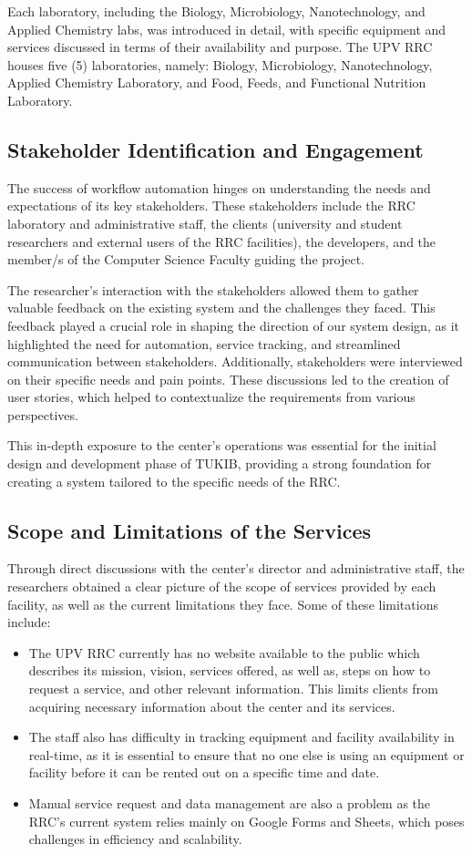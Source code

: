 Each laboratory, including the Biology, Microbiology, Nanotechnology, and Applied Chemistry labs, was introduced in detail, with specific equipment and services discussed in terms of their availability and purpose. The UPV RRC houses five (5) laboratories, namely: Biology, Microbiology, Nanotechnology, Applied Chemistry Laboratory, and Food, Feeds, and Functional Nutrition Laboratory.

\subsection{Stakeholder Identification and Engagement}
The success of workflow automation hinges on understanding the needs and expectations of its key stakeholders. These stakeholders include the RRC laboratory and administrative staff, the clients (university and student researchers and external users of the RRC facilities), the developers, and the member/s of the Computer Science Faculty guiding the project.

The researcher's interaction with the stakeholders allowed them to gather valuable feedback on the existing system and the challenges they faced. This feedback played a crucial role in shaping the direction of our system design, as it highlighted the need for automation, service tracking, and streamlined communication between stakeholders. Additionally, stakeholders were interviewed on their specific needs and pain points. These discussions led to the creation of user stories, which helped to contextualize the requirements from various perspectives. 

This in-depth exposure to the center’s operations was essential for the initial design and development phase of TUKIB, providing a strong foundation for creating a system tailored to the specific needs of the RRC.

\subsection{Scope and Limitations of the Services}
Through direct discussions with the center’s director and administrative staff, the researchers obtained a clear picture of the scope of services provided by each facility, as well as the current limitations they face. Some of these limitations include:

\begin{itemize}
	\item The UPV RRC currently has no website available to the public which describes its mission, vision, services offered, as well as, steps on how to request a service, and other relevant information.   This limits clients from acquiring necessary information about the center and its services.
	\item The staff also has difficulty in tracking equipment and facility availability in real-time, as it is essential to ensure that no one else is using an equipment or facility before it can be rented out on a specific time and date.
	\item Manual service request and data management are also a problem as the RRC’s current system relies mainly on Google Forms and Sheets, which poses challenges in efficiency and scalability.
\end{itemize}

